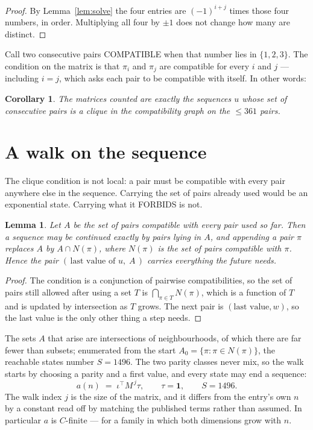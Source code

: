 \documentclass[11pt,a4paper]{article}
\theoremstyle{plain}
\newtheorem{lemma}[theorem]{Lemma}
\newtheorem{corollary}[theorem]{Corollary}
\theoremstyle{definition}
\begin{document}
\begin{proof}
By Lemma~\ref{lem:solve} the four entries are $(-1)^{i+j}$ times those four numbers, in
order. Multiplying all four by $\pm1$ does not change how many are distinct.
\end{proof}

Call two consecutive pairs COMPATIBLE when that number lies in $\{1,2,3\}$. The condition on the
matrix is that $\pi_i$ and $\pi_j$ are compatible for every $i$ and $j$ --- including $i=j$,
which asks each pair to be compatible with itself. In other words:

\begin{corollary}
The matrices counted are exactly the sequences $u$ whose set of consecutive pairs is a clique in
the compatibility graph on the $\le 361$ pairs.
\end{corollary}

\section{A walk on the sequence}

The clique condition is not local: a pair must be compatible with every pair anywhere else in
the sequence. Carrying the set of pairs already used would be an exponential state. Carrying
what it FORBIDS is not.

\begin{lemma}\label{lem:lump}
Let $A$ be the set of pairs compatible with every pair used so far. Then a sequence may be
continued exactly by pairs lying in $A$, and appending a pair $\pi$ replaces $A$ by
$A\cap N(\pi)$, where $N(\pi)$ is the set of pairs compatible with $\pi$. Hence the pair
$(\,\text{last value of }u,\;A\,)$ carries everything the future needs.
\end{lemma}

\begin{proof}
The condition is a conjunction of pairwise compatibilities, so the set of pairs still allowed
after using a set $T$ is $\bigcap_{\pi\in T}N(\pi)$, which is a function of $T$ and is updated
by intersection as $T$ grows. The next pair is $(\text{last value},w)$, so the last value is
the only other thing a step needs.
\end{proof}

The sets $A$ that arise are intersections of neighbourhoods, of which there are far fewer than
subsets; enumerated from the start $A_0=\{\pi:\pi\in N(\pi)\}$, the reachable states number
$S=1496$. The two parity classes never mix, so the walk starts by choosing a parity and a first
value, and every state may end a sequence:
\[
a(n)\;=\;\iota^{\!\top}M^{\,j}\tau ,\qquad \tau=\mathbf{1},\qquad S=1496.
\]
The walk index $j$ is the size of the matrix, and it differs from the entry's own $n$ by a
constant read off by matching the published terms rather than assumed. In particular $a$ is
$C$-finite --- for a family in which both dimensions grow with $n$.
\end{document}

